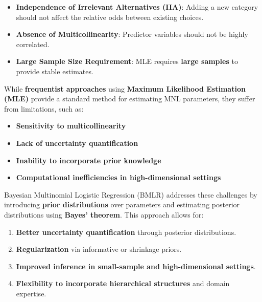 \documentclass[
  letterpaper,
  DIV=11,
  numbers=noendperiod]{scrartcl}
\providecommand{\tightlist}{%
  \setlength{\itemsep}{0pt}\setlength{\parskip}{0pt}}\usepackage{longtable,booktabs,array}
\begin{document}
\begin{itemize}
\tightlist
\item
  \textbf{Independence of Irrelevant Alternatives (IIA)}: Adding a new
  category should not affect the relative odds between existing choices.
\item
  \textbf{Absence of Multicollinearity}: Predictor variables should not
  be highly correlated.
\item
  \textbf{Large Sample Size Requirement}: MLE requires \textbf{large
  samples} to provide stable estimates.
\end{itemize}

While \textbf{frequentist approaches} using \textbf{Maximum Likelihood
Estimation (MLE)} provide a standard method for estimating MNL
parameters, they suffer from limitations, such as:

\begin{itemize}
\tightlist
\item
  \textbf{Sensitivity to multicollinearity}\\
\item
  \textbf{Lack of uncertainty quantification}\\
\item
  \textbf{Inability to incorporate prior knowledge}\\
\item
  \textbf{Computational inefficiencies in high-dimensional settings}
\end{itemize}

Bayesian Multinomial Logistic Regression (BMLR) addresses these
challenges by introducing \textbf{prior distributions} over parameters
and estimating posterior distributions using \textbf{Bayes' theorem}.
This approach allows for:

\begin{enumerate}
\def\labelenumi{\arabic{enumi}.}
\tightlist
\item
  \textbf{Better uncertainty quantification} through posterior
  distributions.\\
\item
  \textbf{Regularization} via informative or shrinkage priors.\\
\item
  \textbf{Improved inference in small-sample and high-dimensional
  settings}.\\
\item
  \textbf{Flexibility to incorporate hierarchical structures} and domain
  expertise.
\end{enumerate}
\end{document}

